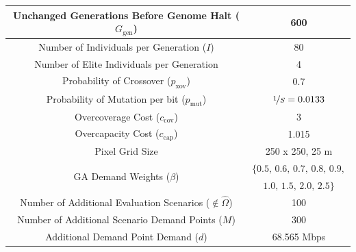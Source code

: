 \documentclass[12pt,dvipsnames]{report}
\begin{document}
\begin{table}[p]
\begin{tabular}{|c|c|}
		\hline 
		Unchanged Generations Before Genome Halt ($G_{\text{gen}}$) & 600 \\ 
		\hline 
		Number of Individuals per Generation ($I$) & 80 \\ 
		\hline
		Number of Elite Individuals per Generation & 4 \\ 
		\hline 
		Probability of Crossover ($p_\text{xov}$) & 0.7 \\ 
		\hline
		Probability of Mutation per bit ($p_\text{mut}$) & $\nicefrac{1}{S} = 0.0133$ \\ 
		\hline 
		Overcoverage Cost ($c_\text{cov}$) & 3 \\ 
		\hline
		Overcapacity Cost ($c_\text{cap}$) & 1.015 \\ 
		\hline
		Pixel Grid Size & 250 x 250, 25 m \\ 
		\hline
		\multirow{2}{*}{GA Demand Weights ($\beta$)} & $\{ 0.5,\, 0.6,\, 0.7,\, 0.8,\, 0.9,$ \\ 
		& $1.0,\, 1.5,\, 2.0,\, 2.5 \}$ \\ 
		\hline
		\hline
		Number of Additional Evaluation Scenarios ($\not\in \hat{\Omega}$) & 100 \\ 
		\hline
		Number of Additional Scenario Demand Points ($M$) & 300 \\ 
		\hline
		Additional Demand Point Demand ($d$) & 68.565 Mbps \\ 
		\hline
	\end{tabular}
	\label{tab:CaseII_SimVal}
\end{table}
\end{document}
